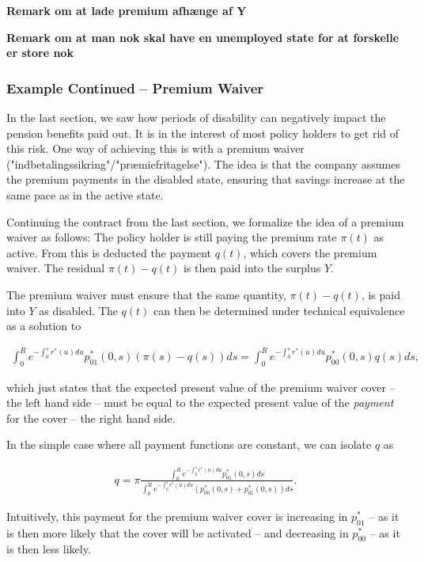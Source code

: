 \documentclass{article}
\newcommand{\1}[1]{\mathbbm{1}_{\left\lbrace #1 \right\rbrace}}
\theoremstyle{break}
\theoremstyle{remark}
\newenvironment{remark}
  {\pushQED{\qed}\renewcommand{\qedsymbol}{\scalebox{1.4}{$\circ$}}\remarkx}
  {\popQED\endremarkx}
\numberwithin{equation}{section}
\begin{document}
\textbf{Remark om at lade premium afhænge af Y}

\textbf{Remark om at man nok skal have en unemployed state for at forskelle er store nok}

\subsubsection{Example Continued -- Premium Waiver} \label{Waiver}

In the last section, we saw how periods of disability can negatively impact the pension benefits paid out. It is in the interest of most policy holders to get rid of this risk. One way of achieving this is with a premium waiver ("indbetalingssikring"/"præmiefritagelse"). The idea is that the company assumes the premium payments in the disabled state, ensuring that savings increase at the same pace as in the active state.

Continuing the contract from the last section, we formalize the idea of a premium waiver as follows: The policy holder is still paying the premium rate $\pi(t)$ as active. From this is deducted the payment $q(t)$, which covers the premium waiver. The residual $\pi(t) - q(t)$ is then paid into the surplus $Y$.

The premium waiver must ensure that the same quantity, $\pi(t) - q(t)$, is paid into $Y$ as disabled. The $q(t)$ can then be determined under technical equivalence as a solution to 

\begin{align*}
	\int_0^R e^{-\int_0^s r^*(u)du}  p_{01}^*(0,s) \left( \pi(s) - q(s) \right) ds = \int_0^R e^{-\int_0^s r^*(u)du} p^*_{00}(0,s) q(s) ds,
\end{align*}

which just states that the expected present value of the premium waiver cover -- the left hand side -- must be equal to the expected present value of the \textit{payment} for the cover -- the right hand side.

\begin{remark}
	In the simple case where all payment functions are constant, we can isolate $q$ as

\begin{align*}
	q = \pi \frac{\int_0^R e^{-\int_0^s r^*(u)du} p_{01}^*(0,s) ds}{\int_0^R e^{-\int_0^s r^*(u)du} \left(p_{00}^*(0,s) + p_{01}^*(0,s)\right) ds}.
\end{align*}

Intuitively, this payment for the premium waiver cover is increasing in $p_{01}^*$ -- as it is then more likely that the cover will be activated -- and decreasing in $p_{00}^*$ -- as it is then less likely.
\end{remark}
\end{document}
